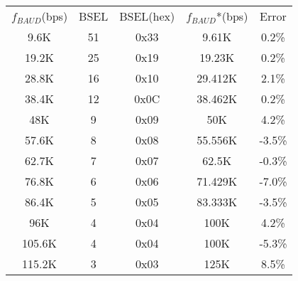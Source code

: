 \begin{tabular}{|c|c|c|c|c|}
  \hline
  \rowcolor[HTML]{FFEAD0} \multicolumn{5}{|c|}{$ f_{PER} $ = 8.0000 MHz} \\
  \hline
  \rowcolor[HTML]{E3FFE3} $ f_{BAUD} $(bps) & BSEL & BSEL(hex) & $ f_{BAUD} $*(bps) & Error \\
  \hline
  9.6K & 51 & 0x33 & 9.61K & 0.2\% \\
  \hline
  19.2K & 25 & 0x19 & 19.23K & 0.2\% \\
  \hline
  28.8K & 16 & 0x10 & 29.412K & 2.1\% \\
  \hline
  38.4K & 12 & 0x0C & 38.462K & 0.2\% \\
  \hline
  48K & 9 & 0x09 & 50K & 4.2\% \\
  \hline
  57.6K & 8 & 0x08 & 55.556K & -3.5\% \\
  \hline
  62.7K & 7 & 0x07 & 62.5K & -0.3\% \\
  \hline
  76.8K & 6 & 0x06 & 71.429K & -7.0\% \\
  \hline
  86.4K & 5 & 0x05 & 83.333K & -3.5\% \\
  \hline
  96K & 4 & 0x04 & 100K & 4.2\% \\
  \hline
  105.6K & 4 & 0x04 & 100K & -5.3\% \\
  \hline
  115.2K & 3 & 0x03 & 125K & 8.5\% \\
  \hline
\end{tabular}